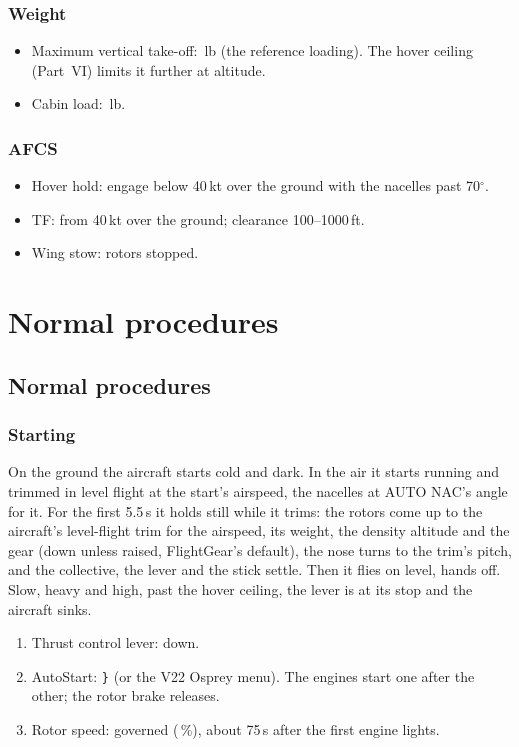 \documentclass[11pt,a4paper,oneside]{book}
\newcommand{\key}[1]{\texttt{#1}}
\begin{document}
\section{Weight}
\begin{itemize}
\item Maximum vertical take-off: \MWRef\,lb (the reference loading). The hover ceiling (Part~VI) limits it further at
altitude.
\item Cabin load: \MCargoMax\,lb.
\end{itemize}

\section{AFCS}
\begin{itemize}
\item Hover hold: engage below 40\,kt over the ground with the nacelles past 70$^\circ$.
\item TF: from 40\,kt over the ground; clearance 100--1000\,ft.
\item Wing stow: rotors stopped.
\end{itemize}

\part{Normal procedures}
\chapter{Normal procedures}
\section{Starting}
On the ground the aircraft starts cold and dark. In the air it starts running and trimmed in level flight at the
start's airspeed, the nacelles at AUTO NAC's angle for it. For the first 5.5\,s it holds still while it trims: the
rotors come up to the aircraft's level-flight trim for the airspeed, its weight, the density altitude and the gear
(down unless raised, FlightGear's default), the nose turns to the trim's pitch, and the collective, the lever and the
stick settle. Then it flies on level, hands off. Slow, heavy and high, past the hover ceiling, the lever is at its
stop and the aircraft sinks.
\begin{enumerate}
\item Thrust control lever: down.
\item AutoStart: \key{\}} (or the V22 Osprey menu). The engines start one after the other; the rotor brake releases.
\item Rotor speed: governed (\MNrHelo\,\%), about 75\,s after the first engine lights.
\end{enumerate}
\end{document}
